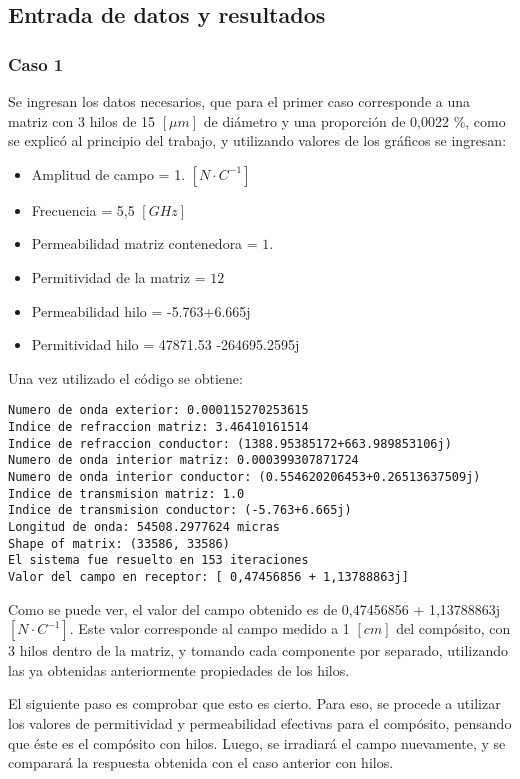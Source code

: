 \documentclass[12pt,letterpaper]{article}
\numberwithin{equation}{section}
\begin{document}
\subsection{Entrada de datos y resultados}

\subsubsection{Caso 1}

Se ingresan los datos necesarios, que para el primer caso corresponde a una matriz con 3 hilos de 15 $[\mu m]$ de diámetro y una proporción de 0,0022 \%, como se explicó al principio del trabajo, y utilizando valores de los gráficos se ingresan:

\begin{itemize}
	\item Amplitud de campo = 1. $[N \cdotp C^{-1}]$
	\item Frecuencia = 5,5 $[GHz]$
	\item Permeabilidad matriz contenedora = $1.$
	\item Permitividad de la matriz = $12$
	\item Permeabilidad hilo = -5.763+6.665j
	\item Permitividad hilo = 47871.53 -264695.2595j
\end{itemize}

Una vez utilizado el código se obtiene:

\begin{lstlisting}
Numero de onda exterior: 0.000115270253615
Indice de refraccion matriz: 3.46410161514
Indice de refraccion conductor: (1388.95385172+663.989853106j)
Numero de onda interior matriz: 0.000399307871724
Numero de onda interior conductor: (0.554620206453+0.26513637509j)
Indice de transmision matriz: 1.0
Indice de transmision conductor: (-5.763+6.665j)
Longitud de onda: 54508.2977624 micras
Shape of matrix: (33586, 33586)
El sistema fue resuelto en 153 iteraciones
Valor del campo en receptor: [ 0,47456856 + 1,13788863j]

\end{lstlisting}

Como se puede ver, el valor del campo obtenido es de  0,47456856 + 1,13788863j $[N \cdot C^{-1}]$. Este valor corresponde al campo medido a 1 $[cm]$ del compósito, con 3 hilos dentro de la matriz, y tomando cada componente por separado, utilizando las ya obtenidas anteriormente propiedades de los hilos.

El siguiente paso es comprobar que esto es cierto. Para eso, se procede a utilizar los valores de permitividad y permeabilidad efectivas para el compósito, pensando que éste es el compósito con hilos. Luego, se irradiará el campo nuevamente, y se comparará la respuesta obtenida con el caso anterior con hilos.
\end{document}
